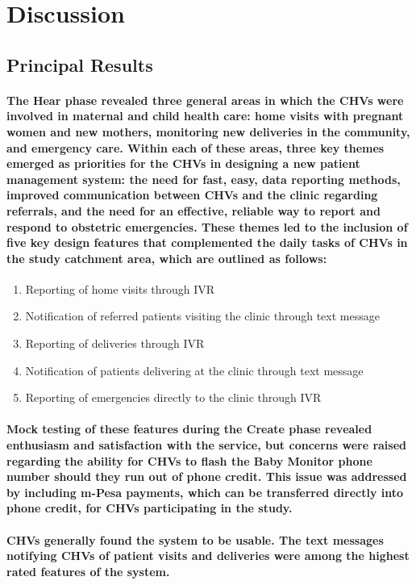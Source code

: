 \section{Discussion}

\subsection{Principal Results}
\paragraph{The Hear phase revealed three general areas in which the CHVs were involved in maternal and child health care: home visits with pregnant women and new mothers, monitoring new deliveries in the community, and emergency care. Within each of these areas, three key themes emerged as priorities for the CHVs in designing a new patient management system: the need for fast, easy, data reporting methods, improved communication between CHVs and the clinic regarding referrals, and the need for an effective, reliable way to report and respond to obstetric emergencies. These themes led to the inclusion of five key design features that complemented the daily tasks of CHVs in the study catchment area, which are outlined as follows:}
\begin{enumerate}
	\item Reporting of home visits through IVR
	\item Notification of referred patients visiting the clinic through text message
	\item Reporting of deliveries through IVR
	\item Notification of patients delivering at the clinic through text message
	\item Reporting of emergencies directly to the clinic through IVR
\end{enumerate}

\paragraph{Mock testing of these features during the Create phase revealed enthusiasm and satisfaction with the service, but concerns were raised regarding the ability for CHVs to flash the Baby Monitor phone number should they run out of phone credit. This issue was addressed by including m-Pesa payments, which can be transferred directly into phone credit, for CHVs participating in the study.}

\paragraph{CHVs generally found the system to be usable. The text messages notifying CHVs of patient visits and deliveries were among the highest rated features of the system. }

